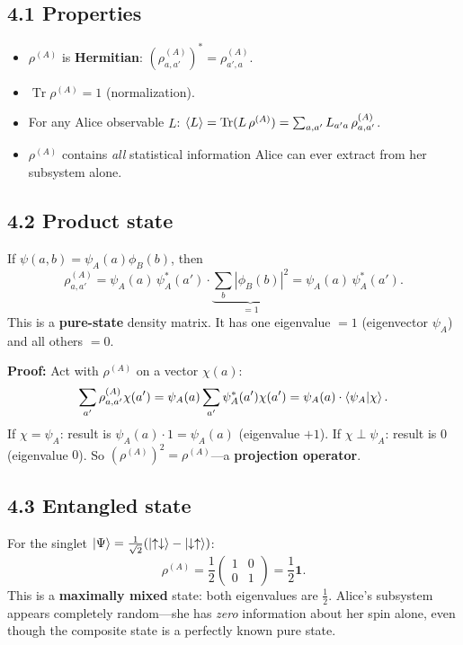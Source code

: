 \documentclass[12pt,a4paper]{article}
\begin{document}
\subsection{4.1 Properties}
\begin{itemize}[nosep]
    \item $\rho^{(A)}$ is \textbf{Hermitian}: $(\rho^{(A)}_{a,a'})^* = \rho^{(A)}_{a',a}$.
    \item $\operatorname{Tr}\rho^{(A)}=1$ (normalization).
    \item For any Alice observable $L$: $\expval{L} = \operatorname{Tr}(L\,\rho^{(A)}) = \sum_{a,a'} L_{a'a}\,\rho^{(A)}_{a,a'}$.
    \item $\rho^{(A)}$ contains \emph{all} statistical information Alice can ever extract from her subsystem alone.
\end{itemize}

\subsection{4.2 Product state}
If $\psi(a,b)=\psi_A(a)\phi_B(b)$, then
\[
    \rho^{(A)}_{a,a'} = \psi_A(a)\,\psi_A^*(a') \cdot \underbrace{\sum_b |\phi_B(b)|^2}_{=1} = \psi_A(a)\,\psi_A^*(a').
\]
This is a \textbf{pure-state} density matrix.  It has one eigenvalue $=1$ (eigenvector $\psi_A$) and all others $=0$.

\noindent\textbf{Proof:} Act with $\rho^{(A)}$ on a vector $\chi(a)$:
\[
    \sum_{a'} \rho^{(A)}_{a,a'}\chi(a') = \psi_A(a)\sum_{a'}\psi_A^*(a')\chi(a') = \psi_A(a)\cdot\braket{\psi_A}{\chi}.
\]
If $\chi=\psi_A$: result is $\psi_A(a)\cdot 1 = \psi_A(a)$ (eigenvalue $+1$).  If $\chi\perp\psi_A$: result is $0$ (eigenvalue $0$).  So $(\rho^{(A)})^2 = \rho^{(A)}$---a \textbf{projection operator}.

\subsection{4.3 Entangled state}
For the singlet $\ket{\Psi}=\frac{1}{\sqrt{2}}(\ket{\uparrow\downarrow}-\ket{\downarrow\uparrow})$:
\[
    \rho^{(A)} = \frac{1}{2}\begin{pmatrix}1&0\\0&1\end{pmatrix} = \frac{1}{2}\mathbf{1}.
\]
This is a \textbf{maximally mixed} state: both eigenvalues are $\frac{1}{2}$.  Alice's subsystem appears completely random---she has \emph{zero} information about her spin alone, even though the composite state is a perfectly known pure state.
\end{document}
